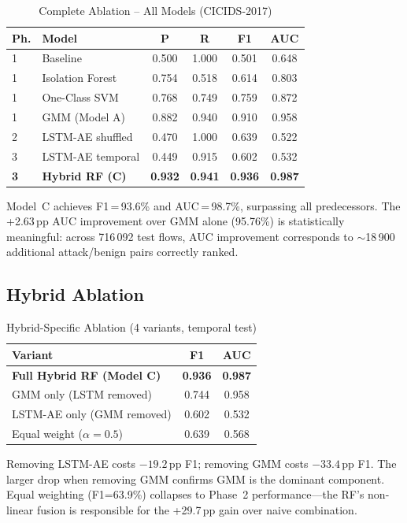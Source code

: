 \documentclass[conference]{IEEEtran}
\begin{document}
\begin{table}[h]
\centering
\caption{Complete Ablation -- All Models (CICIDS-2017)}
\label{tab:ablation}
\begin{tabular}{llcccc}
\toprule
Ph. & Model & P & R & F1 & AUC \\
\midrule
1 & Baseline & 0.500 & 1.000 & 0.501 & 0.648 \\
1 & Isolation Forest & 0.754 & 0.518 & 0.614 & 0.803 \\
1 & One-Class SVM & 0.768 & 0.749 & 0.759 & 0.872 \\
1 & GMM (Model A) & 0.882 & 0.940 & 0.910 & 0.958 \\
\midrule
2 & LSTM-AE shuffled & 0.470 & 1.000 & 0.639 & 0.522 \\
3 & LSTM-AE temporal & 0.449 & 0.915 & 0.602 & 0.532 \\
\midrule
\textbf{3} & \textbf{Hybrid RF (C)} & \textbf{0.932} & \textbf{0.941} & \textbf{0.936} & \textbf{0.987} \\
\bottomrule
\end{tabular}
\end{table}

Model~C achieves F1\,=\,93.6\% and AUC\,=\,98.7\%, surpassing all
predecessors.  The +2.63\,pp AUC improvement over GMM alone (95.76\%)
is statistically meaningful: across 716\,092 test flows, AUC improvement
corresponds to $\sim$18\,900 additional attack/benign pairs correctly
ranked.

\subsection{Hybrid Ablation}

\begin{table}[h]
\centering
\caption{Hybrid-Specific Ablation (4 variants, temporal test)}
\label{tab:hybrid-ablation}
\begin{tabular}{lcc}
\toprule
Variant & F1 & AUC \\
\midrule
\textbf{Full Hybrid RF (Model C)} & \textbf{0.936} & \textbf{0.987} \\
GMM only (LSTM removed) & 0.744 & 0.958 \\
LSTM-AE only (GMM removed) & 0.602 & 0.532 \\
Equal weight ($\alpha=0.5$) & 0.639 & 0.568 \\
\bottomrule
\end{tabular}
\end{table}

Removing LSTM-AE costs $-19.2$\,pp F1; removing GMM costs $-33.4$\,pp
F1.  The larger drop when removing GMM confirms GMM is the dominant
component.  Equal weighting (F1=63.9\%) collapses to Phase~2
performance---the RF's non-linear fusion is responsible for the +29.7\,pp
gain over naive combination.
\end{document}
